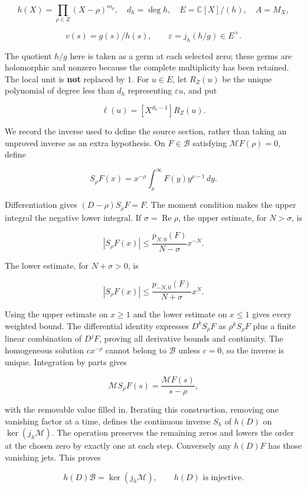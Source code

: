 \documentclass[10pt,a4paper,oneside]{report}
\begin{document}
\[
h(X)=\prod_{\rho\in Z}(X-\rho)^{m_\rho},\quad d_h=\deg h,
\quad E=\mathbb C[X]/(h),\quad A=M_X,
\]

\[v(s)=g(s)/h(s),\qquad \varepsilon=j_h(h/g)\in E^\times.\]

The quotient \(h/g\) here is taken as a germ at each selected zero;
these germs are holomorphic and nonzero because the complete
multiplicity has been retained. The local unit is \textbf{not} replaced
by \(1\). For \(u\in E\), let \(R_Z(u)\) be the unique polynomial of
degree less than \(d_h\) representing \(\varepsilon u\), and put

\[\ell(u)=[X^{d_h-1}]R_Z(u).\tag{8}\]

We record the inverse used to define the source section, rather than
taking an unproved inverse as an extra hypothesis. On \(F\in\mathscr B\)
satisfying \(\mathcal MF(\rho)=0\), define

\[S_\rho F(x)=x^{-\rho}\int_x^\infty F(y)y^{\rho-1}\,dy.\]

Differentiation gives \((D-\rho)S_\rho F=F\). The moment condition makes
the upper integral the negative lower integral. If
\(\sigma=\operatorname{Re}\rho\), the upper estimate, for \(N>\sigma\),
is

\[|S_\rho F(x)|\leq \frac{p_{N,0}(F)}{N-\sigma}x^{-N}.\]

The lower estimate, for \(N+\sigma>0\), is

\[|S_\rho F(x)|\leq \frac{p_{-N,0}(F)}{N+\sigma}x^{N}.\]

Using the upper estimate on \(x\geq1\) and the lower estimate on
\(x\leq1\) gives every weighted bound. The differential identity
expresses \(D^kS_\rho F\) as \(\rho^kS_\rho F\) plus a finite linear
combination of \(D^jF\), proving all derivative bounds and continuity.
The homogeneous solution \(cx^{-\rho}\) cannot belong to \(\mathscr B\)
unless \(c=0\), so the inverse is unique. Integration by parts gives

\[\mathcal MS_\rho F(s)=\frac{\mathcal MF(s)}{s-\rho},\]

with the removable value filled in. Iterating this construction,
removing one vanishing factor at a time, defines the continuous inverse
\(S_h\) of \(h(D)\) on \(\ker(j_h\mathcal M)\). The operation preserves
the remaining zeros and lowers the order at the chosen zero by exactly
one at each step. Conversely any \(h(D)F\) has those vanishing jets.
This proves

\[h(D)\mathscr B=\ker(j_h\mathcal M),\qquad h(D)\text{ is injective}.\tag{9}\]
\end{document}
